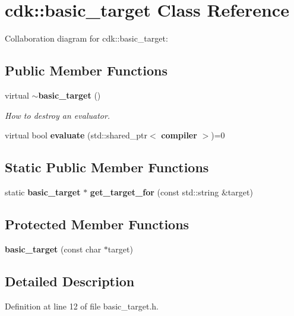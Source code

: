 \section{cdk\+:\+:basic\+\_\+target Class Reference}
\label{classcdk_1_1basic__target}


Collaboration diagram for cdk\+:\+:basic\+\_\+target\+:
\subsection*{Public Member Functions}
\begin{DoxyCompactItemize}
\item 
\mbox{\label{classcdk_1_1basic__target_aaa74cb39cf10b2735b1abc15680898fa}} 
virtual \textbf{ $\sim$basic\+\_\+target} ()
\begin{DoxyCompactList}\small\item\em How to destroy an evaluator. \end{DoxyCompactList}\item 
virtual bool \textbf{ evaluate} (std\+::shared\+\_\+ptr$<$ \textbf{ compiler} $>$)=0
\end{DoxyCompactItemize}
\subsection*{Static Public Member Functions}
\begin{DoxyCompactItemize}
\item 
static \textbf{ basic\+\_\+target} $\ast$ \textbf{ get\+\_\+target\+\_\+for} (const std\+::string \&target)
\end{DoxyCompactItemize}
\subsection*{Protected Member Functions}
\begin{DoxyCompactItemize}
\item 
\mbox{\label{classcdk_1_1basic__target_a789431eed534e3827eb2686ed00f30b8}} 
{\bfseries basic\+\_\+target} (const char $\ast$target)
\end{DoxyCompactItemize}


\subsection{Detailed Description}


Definition at line 12 of file basic\+\_\+target.\+h.



